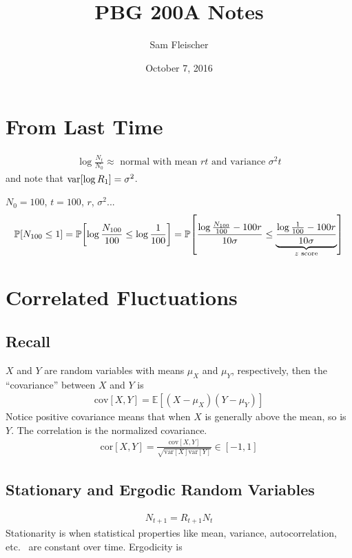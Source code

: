 \documentclass{article}
\title{PBG 200A Notes}
\author{Sam Fleischer}
\date{October 7, 2016}
\newcommand{\prob}{\mathbb{P}}
\newcommand{\cov}{\text{cov}}
\newcommand{\vari}{\text{var}}
\newcommand{\cor}{\text{cor}}
\newcommand{\expec}{\mathbb{E}}
\begin{document}
    \maketitle

    \section{From Last Time}
        \begin{align*}
            \log \frac{N_t}{N_0} \approx \text{ normal with mean $rt$ and variance $\sigma^2 t$}
        \end{align*}
        and note that $\vari\qty[\log R_1] = \sigma^2$.

        $N_0 = 100$, $t = 100$, $r$, $\sigma^2$...
        \begin{align*}
            \prob[N_{100} \leq 1] = \prob\qty[\log \frac{N_{100}}{100} \leq \log\frac{1}{100}] = \prob\qty[\frac{\log\frac{N_{100}}{100} - 100r}{10\sigma} \leq \underbrace{\frac{\log\frac{1}{100} - 100r}{10\sigma}}_{z \text{ score}}]
        \end{align*}

    \section{Correlated Fluctuations}
        \subsection{Recall}
            $X$ and $Y$ are random variables with means $\mu_X$ and $\mu_Y$, respectively, then the ``covariance'' between $X$ and $Y$ is
            \begin{align*}
                \cov[X,Y] = \expec[(X - \mu_X)(Y - \mu_Y)]
            \end{align*}
            Notice positive covariance means that when $X$ is generally above the mean, so is $Y$.  The correlation is the normalized covariance.
            \begin{align*}
                \cor[X,Y] = \frac{\cov[X,Y]}{\sqrt{\vari[X]\vari[Y]}} \in [-1,1]
            \end{align*}
        \subsection{Stationary and Ergodic Random Variables}
            \begin{align*}
                N_{t+1} = R_{t+1}N_t
            \end{align*}
            Stationarity is when statistical properties like mean, variance, autocorrelation, etc.~ are constant over time.
            Ergodicity is 
\end{document}
